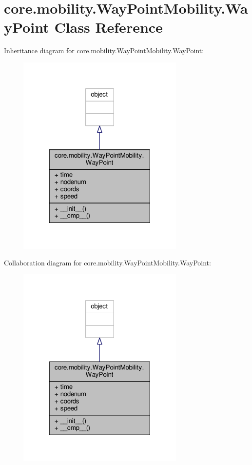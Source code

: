 \hypertarget{classcore_1_1mobility_1_1_way_point_mobility_1_1_way_point}{\section{core.\+mobility.\+Way\+Point\+Mobility.\+Way\+Point Class Reference}
\label{classcore_1_1mobility_1_1_way_point_mobility_1_1_way_point}
}


Inheritance diagram for core.\+mobility.\+Way\+Point\+Mobility.\+Way\+Point\+:
\nopagebreak
\begin{figure}[H]
\begin{center}
\leavevmode
\includegraphics[width=235pt]{classcore_1_1mobility_1_1_way_point_mobility_1_1_way_point__inherit__graph}
\end{center}
\end{figure}


Collaboration diagram for core.\+mobility.\+Way\+Point\+Mobility.\+Way\+Point\+:
\nopagebreak
\begin{figure}[H]
\begin{center}
\leavevmode
\includegraphics[width=235pt]{classcore_1_1mobility_1_1_way_point_mobility_1_1_way_point__coll__graph}
\end{center}
\end{figure}

